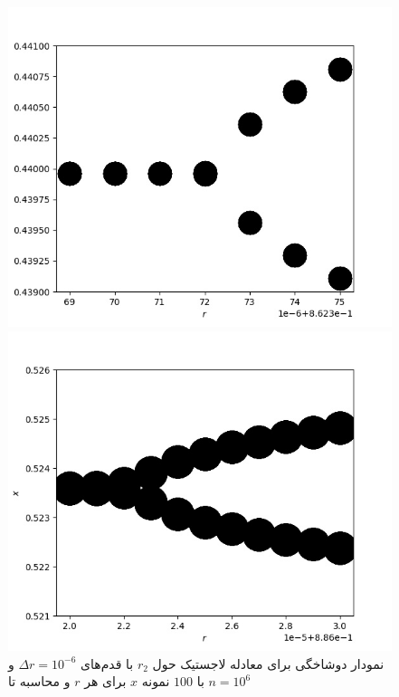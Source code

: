 \documentclass[11pt, a4paper]{article}
\begin{document}
\begin{figure}[h!]
  \begin{minipage}[b]{0.42\textwidth}
    \includegraphics[width=\textwidth]{q4_0.862369_0.862375_7_100_1000000.jpg}
    \caption{نمودار دوشاخگی برای معادله لاجستیک حول $r_2$ با قدم‌های $\Delta r = 10^{-6}$ و با $100$ نمونه $x$ برای هر $r$ و محاسبه تا $n = 10^6$}
    \label{fig:q4_r_2}
  \end{minipage}
  \hfill
  \begin{minipage}[b]{0.42\textwidth}
    \includegraphics[width=\textwidth]{q4_0.88602_0.88603_11_100_100000.jpg}

\end{minipage}
\end{figure}
\end{document}
